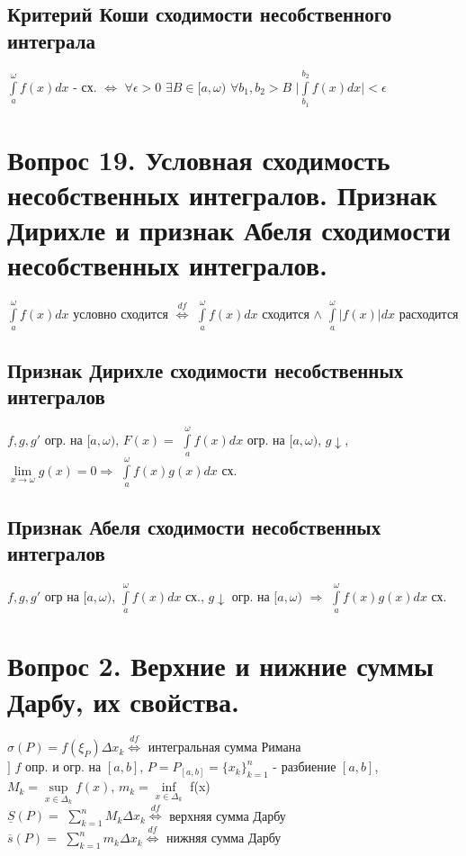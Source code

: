 \documentclass{article}
\begin{document}
\subsection*{Критерий Коши сходимости несобственного интеграла}
$\displaystyle\int\limits_a^\omega f(x)dx$ - сх. $\Leftrightarrow$ $\forall \epsilon > 0$ $\exists B \in [a,\omega)$ $\forall b_1, b_2 > B$ $\bigg|\displaystyle\int\limits_{b_1}^{b_2} f(x)dx\bigg| < \epsilon$

\section{Вопрос 19. Условная сходимость несобственных интегралов. Признак Дирихле и признак Абеля сходимости несобственных интегралов.}
$\int\limits_a^\omega f(x)dx$ условно сходится $\overset{df}\Leftrightarrow$ $\displaystyle\int\limits_a^\omega f(x)dx$ сходится $\land$ $\displaystyle\int\limits_a^\omega |f(x)|dx$ расходится
\subsection*{Признак Дирихле сходимости несобственных интегралов}
$f, g, g'$ огр. на $[a,\omega)$, $F(x) =$ $\displaystyle\int\limits_a^\omega f(x)dx$ огр. на $[a,\omega)$, $g\downarrow$, $\lim\limits_{x \to \omega}{g(x)} = 0 \Rightarrow$ $\displaystyle\int\limits_a^\omega f(x)g(x)dx$ сх.
\subsection*{Признак Абеля сходимости несобственных интегралов}
$f, g, g'$ огр на $[a, \omega)$, $\displaystyle\int\limits_a^\omega f(x)dx$ сх., $g\downarrow$ огр. на $[a,\omega)$ $\Rightarrow$ $\displaystyle\int\limits_a^\omega f(x)g(x)dx$ сх.

\section{Вопрос 2. Верхние и нижние суммы Дарбу, их свойства.}
$\sigma(P)=f(\xi_P)\Delta x_k \overset{df}\Leftrightarrow$ интегральная сумма Римана\\
$]$ $f$ опр. и огр. на $[a,b]$, $P=P_{[a,b]}=\{x_k\}_{k=1}^n$ - разбиение $[a,b]$, $M_k = \sup\limits_{x \in \Delta_k}f(x)$, $m_k = \inf\limits_{x \in \Delta_k}$ f(x) \\
$\underline S(P) =$ $\displaystyle\sum_{k=1}^{n}M_k \Delta x_k \overset{df} \Leftrightarrow$ верхняя сумма Дарбу \\
$\overline s(P) =$ $\displaystyle\sum_{k=1}^{n}m_k \Delta x_k \overset{df} \Leftrightarrow$ нижняя сумма Дарбу
\end{document}
